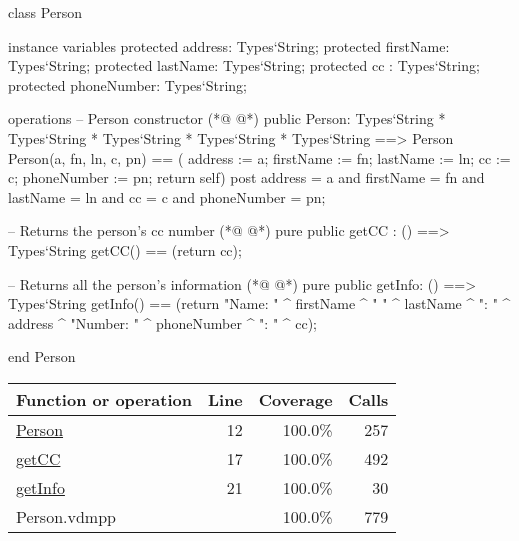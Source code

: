 \begin{vdmpp}[breaklines=true]
class Person

instance variables
  protected address: Types`String;
  protected firstName: Types`String;
  protected lastName: Types`String;
  protected cc : Types`String;
  protected phoneNumber: Types`String;
  
operations
 -- Person constructor
(*@
\label{Person:12}
@*)
 public Person: Types`String * Types`String * Types`String * Types`String * Types`String ==> Person
  Person(a, fn, ln, c, pn) == ( address := a; firstName := fn; lastName := ln; cc := c; phoneNumber := pn; return self)
 post address = a and firstName = fn and lastName = ln and cc = c and phoneNumber = pn;
 
 -- Returns the person's cc number
(*@
\label{getCC:17}
@*)
 pure public getCC : () ==> Types`String
  getCC() == (return cc);
 
 -- Returns all the person's information
(*@
\label{getInfo:21}
@*)
 pure public getInfo: () ==> Types`String
  getInfo() == (return "Name: " ^ firstName ^ " " ^ lastName ^ "\nAddress: " ^ address ^ "\nPhone Number: " ^ phoneNumber ^ "\nCC: " ^ cc);

end Person
\end{vdmpp}
\bigskip
\begin{longtable}{|l|r|r|r|}
\hline
Function or operation & Line & Coverage & Calls \\
\hline
\hline
\hyperref[Person:12]{Person} & 12&100.0\% & 257 \\
\hline
\hyperref[getCC:17]{getCC} & 17&100.0\% & 492 \\
\hline
\hyperref[getInfo:21]{getInfo} & 21&100.0\% & 30 \\
\hline
\hline
Person.vdmpp & & 100.0\% & 779 \\
\hline
\end{longtable}

